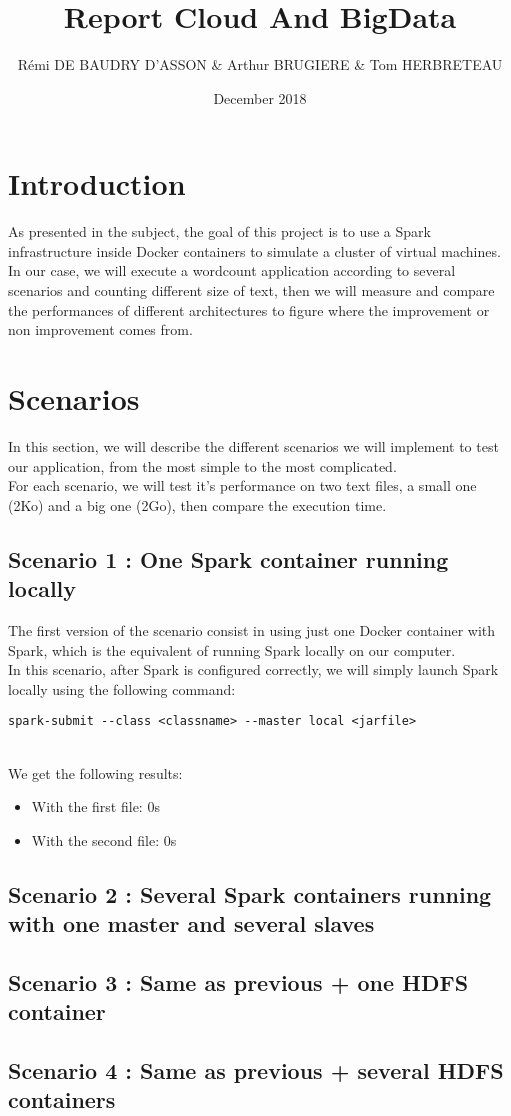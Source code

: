 \documentclass{article}
\title{Report Cloud And BigData}
\author{Rémi DE BAUDRY D'ASSON & Arthur BRUGIERE & Tom HERBRETEAU }
\date{December 2018}
\begin{document}
\maketitle

\section{Introduction}

As presented in the subject, the goal of this project is to use a Spark infrastructure inside Docker containers to simulate a cluster of virtual machines. \\

In our case, we will execute a wordcount application according to several scenarios and counting different size of text, then we will measure and compare the performances of different architectures to figure where the improvement or non improvement comes from.

\section{Scenarios}

In this section, we will describe the different scenarios we will implement to test our application, from the most simple to the most complicated. \\

For each scenario, we will test it's performance on two text files, a small one (2Ko) and a big one (2Go), then compare the execution time.

\subsection{Scenario 1 : One Spark container running locally}

The first version of the scenario consist in using just one Docker container with Spark, which is the equivalent of running Spark locally on our computer. \\

In this scenario, after Spark is configured correctly, we will simply launch Spark locally using the following command: 
\begin{lstlisting}
spark-submit --class <classname> --master local <jarfile> 
\end{lstlisting}
\ \\

\noindent We get the following results:
\begin{itemize}
  \item With the first file: 0s
  \item With the second file: 0s
\end{itemize}

\subsection{Scenario 2 : Several Spark containers running with one master and several slaves}


\subsection{Scenario 3 : Same as previous + one HDFS container}

\subsection{Scenario 4 : Same as previous + several HDFS containers}
\end{document}
